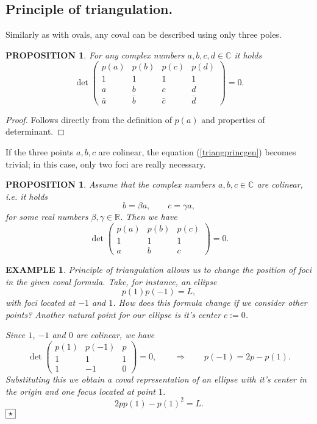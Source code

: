 \documentclass[10pt,a4paper,reqno]{amsart}
\newtheorem{exa}[defi]{\bf E\scriptsize XAMPLE \normalsize}
\newtheorem{prop}[defi]{\bf P\scriptsize ROPOSITION \normalsize}
\def\kopr{\hfill\raisebox{3pt}{\framebox{$\star$}}}
\newenvironment{example}{\begin{exa}\rm}{$\kopr$\end{exa}}
\newenvironment{proposition}{\begin{prop}\it}{\end{prop}}
\newcommand{\zav}[1]{\left( #1 \right)}
\newcommand{\deter}[1]{\det\zav{#1}}
\begin{document}
\subsection{Principle of triangulation.}
Similarly as with ovals, any coval can be described using only three poles.
\begin{proposition}
For any complex numbers $a,b,c,d\in\mathbb{C}$ it holds
\begin{equation}\label{triangprincgen}
\deter{
\begin{array}{cccc}
p(a) & p(b) & p(c) & p(d)  \\
1 & 1 & 1 & 1  \\
a & b & c & d  \\
\bar a & \bar b & \bar c & \bar d 
\end{array}}=0.
\end{equation}
\end{proposition}
\begin{proof}
Follows directly from the definition of $p(a)$ and properties of determinant.
\end{proof}
If the three points $a,b,c$ are colinear, the equation (\ref{triangprincgen}) becomes trivial; in this case, only two foci are really necessary. 
\begin{proposition}
Assume that the complex numbers $a,b,c\in\mathbb{C}$ are colinear, i.e. it holds
$$
b=\beta a ,\qquad c=\gamma a,
$$
for some real numbers $\beta,\gamma\in\mathbb{R}$. Then we have
\begin{equation}\label{triangprinc}
\deter{
\begin{array}{ccc}
p(a) & p(b) & p(c)   \\
1 & 1 & 1   \\
a & b & c 
\end{array}}=0.
\end{equation}
\end{proposition}
\begin{example}
Principle of triangulation allows us to change the position of foci in the given coval formula. Take, for instance, an ellipse
$$
p(1)p(-1)=L,
$$
with foci located at $-1$ and $1$. How does this formula change if we consider other points? Another natural point for our ellipse is it's center $c:=0$.

Since $1$, $-1$ and $0$ are colinear, we have
$$
\deter{
\begin{array}{ccc}
p(1) & p(-1) & p   \\
1 & 1 & 1   \\
1 & -1 & 0 
\end{array}}=0,\qquad \Longrightarrow \qquad p(-1)=2p-p(1).
$$
Substituting this we obtain a coval representation of an ellipse with it's center in the origin and one focus located at point $1$.
$$
2pp(1)-p(1)^2=L.
$$
\end{example}
\end{document}
